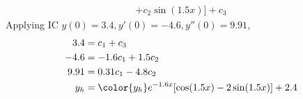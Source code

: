 \begin{enumerate}
\begin{align}
                      + c_{2}\sin(1.5x)] + c_{3}
          \end{align}
          Applying IC $ y(0) = 3.4, y'(0) = -4.6, y''(0) = 9.91 $,
          \begin{align}
              3.4   & = c_{1} + c_{3}                                         \\
              -4.6  & = -1.6c_{1} + 1.5c_{2}                                  \\
              9.91  & = 0.31c_{1} - 4.8c_{2}                                  \\
              y_{h} & = \color{y_h} e^{-1.6x}[\cos(1.5x) - 2\sin(1.5x)] + 2.4
          \end{align}
          \begin{figure}[H]
              \centering
          \end{figure}


\end{enumerate}
